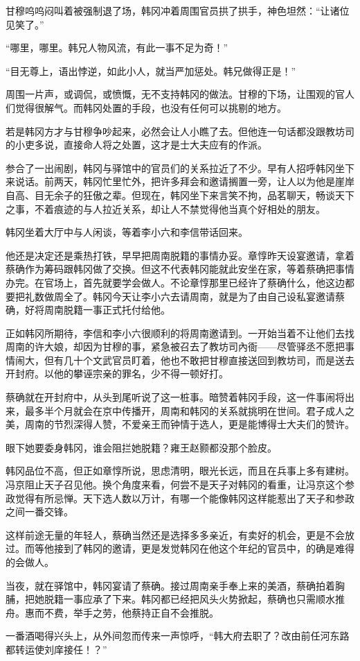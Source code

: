 甘穆呜呜闷叫着被强制退了场，韩冈冲着周围官员拱了拱手，神色坦然：“让诸位见笑了。”

“哪里，哪里。韩兄人物风流，有此一事不足为奇！”

“目无尊上，语出悖逆，如此小人，就当严加惩处。韩兄做得正是！”

周围一片声，或调侃，或愤慨，无不支持韩冈的做法。甘穆的下场，让围观的官人们觉得很解气。而韩冈处置的手段，也没有任何可以挑剔的地方。

若是韩冈方才与甘穆争吵起来，必然会让人小瞧了去。但他连一句话都没跟教坊司的小吏多说，直接命人将之处置，这才是士大夫应有的作派。

参合了一出闹剧，韩冈与驿馆中的官员们的关系拉近了不少。早有人招呼韩冈坐下来说话。前两天，韩冈忙里忙外，把许多拜会和邀请搁置一旁，让人以为他是崖岸自高、目无余子的狂傲之辈。但现在，韩冈坐下来言笑不拘，品茗聊天，畅谈天下之事，不着痕迹的与人拉近关系，却让人不禁觉得他当真个好相处的朋友。

韩冈坐着大厅中与人闲谈，等着李小六和李信带话回来。

他还是决定还是乘热打铁，早早把周南脱籍的事情办妥。章惇昨天设宴邀请，拿着蔡确作为筹码跟韩冈做了交换。但这不代表韩冈能就此安坐在家，等着蔡确把事情办完。在官场上，首先就要学会做人。不论章惇那里已经许了蔡确什么，他这边都要把礼数做周全了。韩冈今天让李小六去请周南，就是为了由自己设私宴邀请蔡确，好将周南脱籍一事正式托付给他。

正如韩冈所期待，李信和李小六很顺利的将周南邀请到。一开始当着不让他们去找周南的许大娘，却因为甘穆的事，紧急被召去了教坊司內衙——尽管驿丞不愿把事情闹大，但有几十个文武官员盯着，他也不敢把甘穆直接送回到教坊司，而是送去开封府。以他的攀诬宗亲的罪名，少不得一顿好打。

蔡确就在开封府中，从头到尾听说了这一桩事。暗赞着韩冈手段，这一件事闹将出来，最多半个月就会在京中传播开，周南和韩冈的关系就挑明在世间。君子成人之美，周南的节烈深得人赞，不爱亲王而钟情于选人，更是能博得士大夫们的赞许。

眼下她要委身韩冈，谁会阻拦她脱籍？雍王赵颢都没那个脸皮。

韩冈品位不高，但正如章惇所说，思虑清明，眼光长远，而且在兵事上多有建树。冯京阻止天子召见他。换个角度来看，何尝不是天子对韩冈的看重，让冯京这个参政觉得有所忌惮。天下选人数以万计，有哪一个能像韩冈这样能惹出了天子和参政之间一番交锋。

这样前途无量的年轻人，蔡确当然还是选择多多亲近，有卖好的机会，更是不会放过。而等他接到了韩冈的邀请，更是发觉韩冈在他这个年纪的官员中，的确是难得的会做人。

当夜，就在驿馆中，韩冈宴请了蔡确。接过周南亲手奉上来的美酒，蔡确拍着胸脯，把她脱籍一事应承了下来。韩冈都已经把风头火势掀起，蔡确也只需顺水推舟。惠而不费，举手之劳，他蔡持正自不会推脱。

一番酒喝得兴头上，从外间忽而传来一声惊呼，“韩大府去职了？改由前任河东路都转运使刘庠接任！？”

